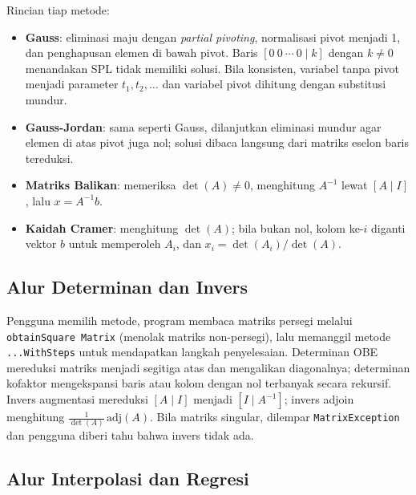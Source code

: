 \documentclass[12pt,a4paper]{report}
\begin{document}
Rincian tiap metode:

\begin{itemize}
  \item \textbf{Gauss}: eliminasi maju dengan \textit{partial pivoting},
    normalisasi pivot menjadi 1, dan penghapusan elemen di bawah pivot.
    Baris $[0\ 0\ \cdots\ 0 \mid k]$ dengan $k \neq 0$ menandakan SPL tidak
    memiliki solusi. Bila konsisten, variabel tanpa pivot menjadi parameter
    $t_1, t_2, \dots$ dan variabel pivot dihitung dengan substitusi mundur.
  \item \textbf{Gauss-Jordan}: sama seperti Gauss, dilanjutkan eliminasi mundur
    agar elemen di atas pivot juga nol; solusi dibaca langsung dari matriks
    eselon baris tereduksi.
  \item \textbf{Matriks Balikan}: memeriksa $\det(A) \neq 0$, menghitung
    $A^{-1}$ lewat $[A \mid I]$, lalu $x = A^{-1}b$.
  \item \textbf{Kaidah Cramer}: menghitung $\det(A)$; bila bukan nol, kolom
    ke-$i$ diganti vektor $b$ untuk memperoleh $A_i$, dan
    $x_i = \det(A_i)/\det(A)$.
\end{itemize}

\subsection{Alur Determinan dan Invers}

Pengguna memilih metode, program membaca matriks persegi melalui
\texttt{obtainSquare \newline Matrix} (menolak matriks non-persegi), lalu memanggil
metode \texttt{...WithSteps} untuk mendapatkan langkah penyelesaian.
Determinan OBE mereduksi matriks menjadi segitiga atas dan mengalikan
diagonalnya; determinan kofaktor mengekspansi baris atau kolom dengan nol
terbanyak secara rekursif. Invers augmentasi mereduksi $[A \mid I]$ menjadi
$[I \mid A^{-1}]$; invers adjoin menghitung
$\frac{1}{\det(A)}\,\mathrm{adj}(A)$. Bila matriks singular, dilempar
\texttt{MatrixException} dan pengguna diberi tahu bahwa invers tidak ada.

\subsection{Alur Interpolasi dan Regresi}
\end{document}
